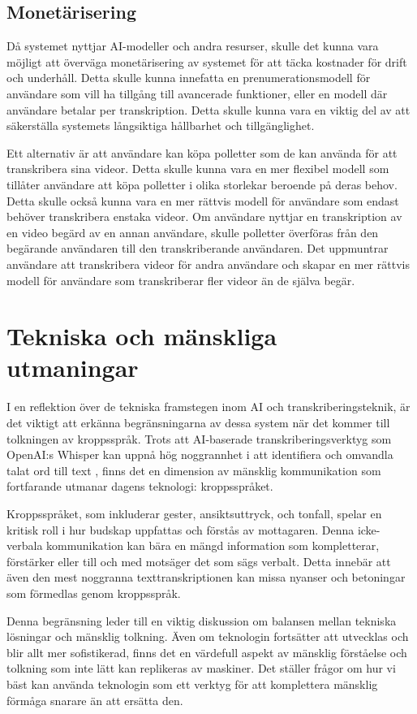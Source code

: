 \subsection{Monetärisering}
Då systemet nyttjar AI-modeller och andra resurser, skulle det kunna vara
möjligt att överväga monetärisering av systemet för att täcka kostnader för
drift och underhåll. Detta skulle kunna innefatta en prenumerationsmodell för
användare som vill ha tillgång till avancerade funktioner, eller en modell
där användare betalar per transkription. Detta skulle kunna vara en viktig del
av att säkerställa systemets långsiktiga hållbarhet och tillgänglighet.

Ett alternativ är att användare kan köpa polletter som de kan använda för att
transkribera sina videor. Detta skulle kunna vara en mer flexibel modell som
tillåter användare att köpa polletter i olika storlekar beroende på deras
behov. Detta skulle också kunna vara en mer rättvis modell för användare som
endast behöver transkribera enstaka videor. Om användare nyttjar en
transkription av en video begärd av en annan användare, skulle polletter
överföras från den begärande användaren till den transkriberande användaren.
Det uppmuntrar användare att transkribera videor för andra användare och
skapar en mer rättvis modell för användare som transkriberar fler videor än de
själva begär.

\section{Tekniska och mänskliga utmaningar}
I en reflektion över de tekniska framstegen inom AI och transkriberingsteknik,
är det viktigt att erkänna begränsningarna av dessa system när det kommer till
tolkningen av kroppsspråk. Trots att AI-baserade transkriberingsverktyg som
OpenAI:s Whisper kan uppnå hög noggrannhet i att identifiera och omvandla
talat ord till text \cite{OpenAIWhisper}, finns det en dimension av mänsklig
kommunikation som fortfarande utmanar dagens teknologi: kroppsspråket.

Kroppsspråket, som inkluderar gester, ansiktsuttryck, och tonfall, spelar en
kritisk roll i hur budskap uppfattas och förstås av mottagaren. Denna
icke-verbala kommunikation kan bära en mängd information som kompletterar,
förstärker eller till och med motsäger det som sägs verbalt. Detta innebär att
även den mest noggranna texttranskriptionen kan missa nyanser och betoningar
som förmedlas genom kroppsspråk.

Denna begränsning leder till en viktig diskussion om balansen mellan tekniska
lösningar och mänsklig tolkning. Även om teknologin fortsätter att utvecklas
och blir allt mer sofistikerad, finns det en värdefull aspekt av mänsklig
förståelse och tolkning som inte lätt kan replikeras av maskiner. Det ställer
frågor om hur vi bäst kan använda teknologin som ett verktyg för att
komplettera mänsklig förmåga snarare än att ersätta den.

